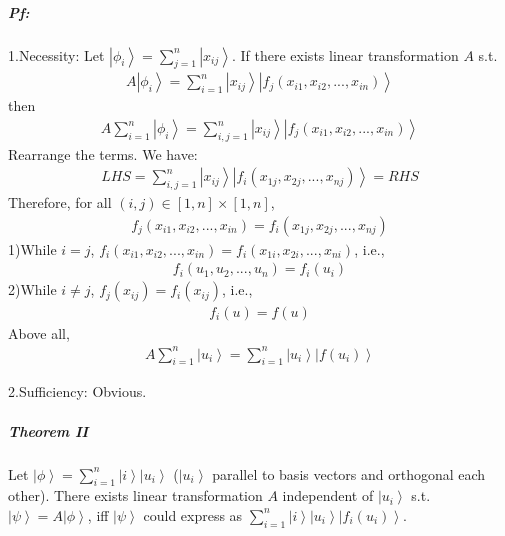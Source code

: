 \documentclass[%
 reprint,
 amsmath,amssymb,
pra,
]{revtex4-1}
\begin{document}
\subparagraph{Pf:} 1.Necessity: Let $\left|\phi_i\right\rangle = \sum_{j=1}^n \left|x_{ij}\right\rangle$. If there exists linear transformation $A$ s.t.
\begin{align*}
A\left|\phi_i\right\rangle = \sum_{i=1}^n\left|x_{ij}\right\rangle\left|f_{j}\left(x_{i1}, x_{i2}, ..., x_{in}\right)\right\rangle
\end{align*}
then
\begin{align*}
A\sum_{i=1}^{n}\left|\phi_i\right\rangle = \sum_{i, j=1}^n\left|x_{ij}\right\rangle\left|f_{j}\left(x_{i1}, x_{i2}, ..., x_{in}\right)\right\rangle
\end{align*}
Rearrange the terms. We have: 
\begin{align*}
LHS = \sum_{i, j=1}^n\left|x_{ij}\right\rangle\left|f_{i}\left(x_{1j}, x_{2j}, ..., x_{nj}\right)\right\rangle = RHS
\end{align*}
Therefore, for all $\left(i, j\right) \in \left[1, n\right]\times\left[1, n\right]$, 
\begin{align*}
f_{j}\left(x_{i1}, x_{i2}, ..., x_{in}\right) = f_{i}\left(x_{1j}, x_{2j}, ..., x_{nj}\right)
\end{align*}
1)While $i=j$, $f_{i}\left(x_{i1}, x_{i2}, ..., x_{in}\right) = f_{i}\left(x_{1i}, x_{2i}, ..., x_{ni}\right)$, i.e., 
\begin{align*}
f_i\left(u_1, u_2, ...,u_n\right) = f_i\left(u_i\right)
\end{align*}
2)While $i\neq j$, $f_j\left(x_{ij}\right) = f_i\left(x_{ij}\right)$, i.e., 
\begin{align*}
f_i\left(u\right) = f\left(u\right)
\end{align*}
Above all, 
\begin{align*}
A\sum_{i=1}^{n}\left|u_i\right\rangle = \sum_{i=1}^{n}\left|u_i\right\rangle\left|f\left(u_i\right)\right\rangle
\end{align*}

2.Sufficiency: Obvious.

\subparagraph{Theorem II} Let $\left|\phi\right\rangle = \sum_{i=1}^n \left|i\right\rangle\left|u_i\right\rangle$ ($\left|u_i\right\rangle$ parallel to basis vectors and orthogonal each other). There exists 
linear transformation $A$ independent of $\left|u_{i}\right\rangle$ s.t. $\left|\psi\right\rangle = A\left|\phi\right\rangle$, iff $\left|\psi\right\rangle$ could express as $\sum_{i=1}^n \left|i\right\rangle\left|u_i\right\rangle\left|f_{i}\left(u_i\right)\right\rangle$.
\end{document}
